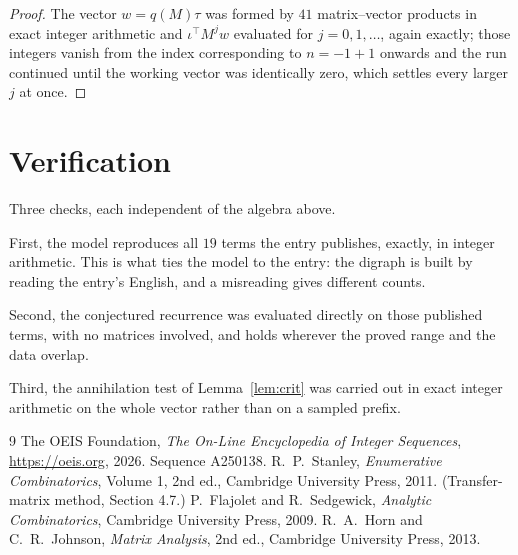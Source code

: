 \documentclass[11pt,a4paper]{article}
\theoremstyle{plain}
\theoremstyle{definition}
\begin{document}
\begin{proof}
The vector $w=q(M)\tau$ was formed by $41$ matrix--vector products in exact integer
arithmetic and $\iota^{\!\top}M^{j}w$ evaluated for $j=0,1,\dots$, again exactly; those
integers vanish from the index corresponding to $n=-1+1$ onwards and the run continued
until the working vector was identically zero, which settles every larger $j$ at once.
\end{proof}

\section{Verification}

Three checks, each independent of the algebra above.

First, the model reproduces all $19$ terms the entry publishes, exactly, in integer
arithmetic. This is what ties the model to the entry: the digraph is built by reading the
entry's English, and a misreading gives different counts.

Second, the conjectured recurrence was evaluated directly on those published terms, with no
matrices involved, and holds wherever the proved range and the data overlap.

Third, the annihilation test of Lemma~\ref{lem:crit} was carried out in exact integer
arithmetic on the whole vector rather than on a sampled prefix.

\begin{thebibliography}{9}
 The OEIS Foundation, \emph{The On-Line Encyclopedia of Integer
Sequences}, \url{https://oeis.org}, 2026. Sequence A250138.
 R.~P.~Stanley, \emph{Enumerative Combinatorics}, Volume 1, 2nd ed.,
Cambridge University Press, 2011. (Transfer-matrix method, Section 4.7.)
 P.~Flajolet and R.~Sedgewick, \emph{Analytic Combinatorics}, Cambridge
University Press, 2009.
 R.~A.~Horn and C.~R.~Johnson, \emph{Matrix Analysis}, 2nd ed., Cambridge
University Press, 2013.
\end{thebibliography}
\end{document}

